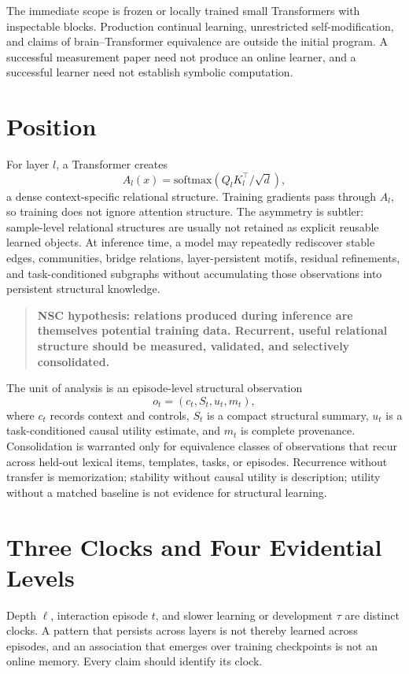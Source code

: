 \documentclass[11pt]{article}
\begin{document}
The immediate scope is frozen or locally trained small Transformers with inspectable blocks. Production continual learning, unrestricted self-modification, and claims of brain--Transformer equivalence are outside the initial program. A successful measurement paper need not produce an online learner, and a successful learner need not establish symbolic computation.
\section{Position}
For layer $l$, a Transformer creates
\[
A_l(x)=\mathrm{softmax}(Q_lK_l^\top/\sqrt d),
\]
a dense context-specific relational structure. Training gradients pass through $A_l$, so training does not ignore attention structure. The asymmetry is subtler: sample-level relational structures are usually not retained as explicit reusable learned objects. At inference time, a model may repeatedly rediscover stable edges, communities, bridge relations, layer-persistent motifs, residual refinements, and task-conditioned subgraphs without accumulating those observations into persistent structural knowledge.

\begin{quote}\textbf{NSC hypothesis: relations produced during inference are themselves potential training data. Recurrent, useful relational structure should be measured, validated, and selectively consolidated.}\end{quote}

The unit of analysis is an episode-level structural observation
\begin{equation}
o_t=(c_t,S_t,u_t,m_t),
\end{equation}
where $c_t$ records context and controls, $S_t$ is a compact structural summary, $u_t$ is a task-conditioned causal utility estimate, and $m_t$ is complete provenance. Consolidation is warranted only for equivalence classes of observations that recur across held-out lexical items, templates, tasks, or episodes. Recurrence without transfer is memorization; stability without causal utility is description; utility without a matched baseline is not evidence for structural learning.

\section{Three Clocks and Four Evidential Levels}
Depth $\ell$, interaction episode $t$, and slower learning or development $\tau$ are distinct clocks. A pattern that persists across layers is not thereby learned across episodes, and an association that emerges over training checkpoints is not an online memory. Every claim should identify its clock.
\end{document}
